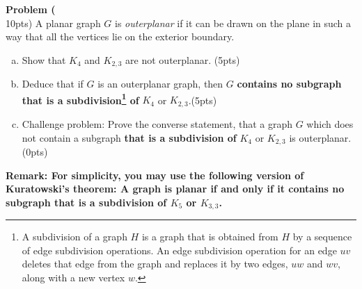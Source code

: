 \documentclass{article}
\newenvironment{problem}[2][Problem]
    { \begin{mdframed}[backgroundcolor=gray!20] \textbf{#1 #2} \\}
    {  \end{mdframed}}
\begin{document}
\begin{problem}{1} (10pts)
A planar graph $G$ is \emph{outerplanar} if it can be drawn on the plane in such a way that all the vertices lie on the exterior boundary.
\begin{enumerate}[(a)]
    \item Show that $K_4$ and $K_{2,3}$ are not outerplanar. (5pts)
    \item Deduce that if $G$ is an outerplanar graph, then $G$ \textbf{contains no subgraph that is a subdivision\footnote{A subdivision of a graph $H$ is a graph that is obtained from $H$  by a sequence of edge subdivision operations. An edge subdivision operation for an edge $uv$ deletes that edge from the graph and replaces it by two edges, $uw$ and $wv$, along with a new vertex $w$.}  of} $K_4$ or $K_{2,3}$.(5pts)
    \item Challenge problem: Prove the converse statement, that a graph $G$ which does not contain a subgraph \textbf{that is a subdivision of}  $K_4$ or $K_{2,3}$ is outerplanar. (0pts)
\end{enumerate}

\noindent\textbf{Remark: For simplicity, you may use the following version of Kuratowski's theorem: A graph is planar if and only if it contains no subgraph that is a subdivision of $K_5$ or $K_{3,3}$.}
\end{problem}
\end{document}
